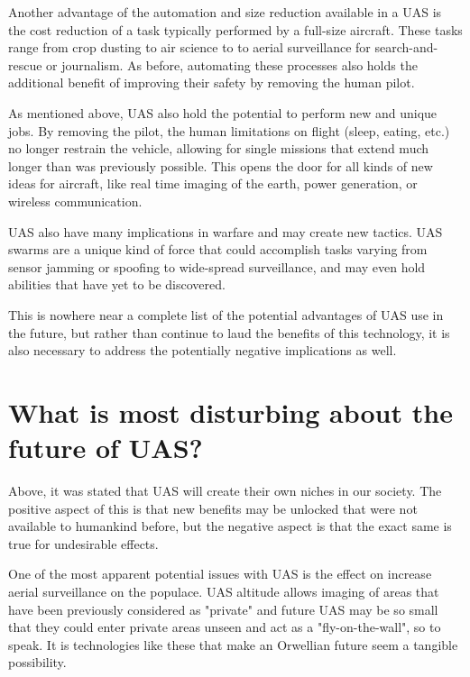 \documentclass[]{aiaa-tc}%
\begin{document}
Another advantage of the automation and size reduction available in a UAS is the cost reduction of a task typically performed by a full-size aircraft.  These tasks range from crop dusting to air science to to aerial surveillance for search-and-rescue or journalism.  As before, automating these processes also holds the additional benefit of improving their safety by removing the human pilot.

As mentioned above, UAS also hold the potential to perform new and unique jobs.  By removing the pilot, the human limitations on flight (sleep, eating, etc.) no longer restrain the vehicle, allowing for single missions that extend much longer than was previously possible.  This opens the door for all kinds of new ideas for aircraft, like real time imaging of the earth, power generation, or wireless communication.

UAS also have many implications in warfare and may create new tactics.  UAS swarms are a unique kind of force that could accomplish tasks varying from sensor jamming or spoofing to wide-spread surveillance, and may even hold abilities that have yet to be discovered.

This is nowhere near a complete list of the potential advantages of UAS use in the future, but rather than continue to laud the benefits of this technology, it is also necessary to address the potentially negative implications as well.

\clearpage
\section*{What is most disturbing about the future of UAS?}

Above, it was stated that UAS will create their own niches in our society.  The positive aspect of this is that new benefits may be unlocked that were not available to humankind before, but the negative aspect is that the exact same is true for undesirable effects.

One of the most apparent potential issues with UAS is the effect on increase aerial surveillance on the populace.  UAS altitude allows imaging of areas that have been previously considered as "private" and future UAS may be so small that they could enter private areas unseen and act as a "fly-on-the-wall", so to speak.  It is technologies like these that make an Orwellian future seem a tangible possibility.
\end{document}
